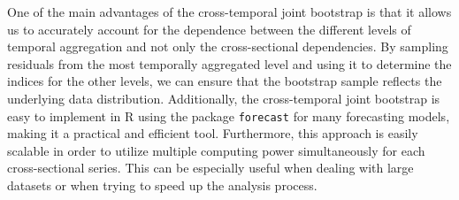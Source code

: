 \documentclass[a4paper,11pt]{article}
\theoremstyle{definition}
\begin{document}
One of the main advantages of the cross-temporal joint bootstrap is that it allows us to accurately account for the dependence between the different levels of temporal aggregation and not only the cross-sectional dependencies. By sampling residuals from the most temporally aggregated level and using it to determine the indices for the other levels, we can ensure that the bootstrap sample reflects the underlying data distribution. Additionally, the cross-temporal joint bootstrap is easy to implement in \textsf{R} \citep{rcoreteam2022} using the package \texttt{forecast} \citep{Rforecast} for many forecasting models, making it a practical and efficient tool. Furthermore, this approach is easily scalable in order to utilize multiple computing power simultaneously for each cross-sectional series. This can be especially useful when dealing with large datasets or when trying to speed up the analysis process.
\end{document}
